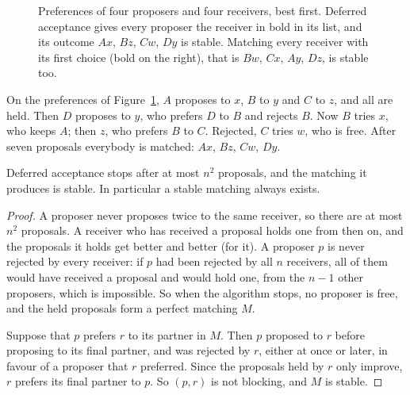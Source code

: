 \begin{figure}[ht]
\centering
{}
\caption{Preferences of four proposers and four receivers, best first. Deferred acceptance gives every proposer the receiver in
bold in its list, and its outcome $Ax$, $Bz$, $Cw$, $Dy$ is stable. Matching every receiver with its first choice (bold on the right),
that is $Bw$, $Cx$, $Ay$, $Dz$, is stable too.}
\label{fig:galeshapley}
\end{figure}

On the preferences of Figure~\ref{fig:galeshapley}, $A$ proposes to $x$, $B$ to $y$ and $C$ to $z$, and all are held. Then $D$ proposes to $y$,
who prefers $D$ to $B$ and rejects $B$. Now $B$ tries $x$, who keeps $A$; then $z$, who prefers $B$ to $C$. Rejected, $C$ tries $w$, who is free.
After seven proposals everybody is matched: $Ax$, $Bz$, $Cw$, $Dy$.

\begin{theorem}\label{thm:galeshapley}
Deferred acceptance stops after at most $n^2$ proposals, and the matching it produces is stable. In particular a stable matching
always exists.
\end{theorem}
\begin{proof}
A proposer never proposes twice to the same receiver, so there are at most $n^2$ proposals. A receiver who has received a proposal
holds one from then on, and the proposals it holds get better and better (for it). A proposer $p$ is never rejected by every receiver: if
$p$ had been rejected by all $n$ receivers, all of them would have received a proposal and would hold one, from the $n-1$ other proposers, which
is impossible. So when the algorithm stops, no proposer is free, and the held proposals form a perfect matching $M$.

Suppose that $p$ prefers $r$ to its partner in $M$. Then $p$ proposed to $r$ before proposing to its final partner, and was rejected by $r$,
either at once or later, in favour of a proposer that $r$ preferred. Since the proposals held by $r$ only improve, $r$ prefers its final partner to
$p$. So $(p,r)$ is not blocking, and $M$ is stable.
\end{proof}

